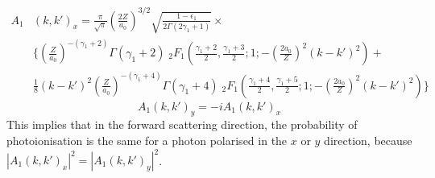 \begin{equation} \label{eq:A1-Forward}
\boxed{
\begin{split}
     A_1 & (k,k')_x  =  \frac{\pi}{\sqrt{\pi}}  
                        \left( \frac{2Z}{a_0} \right)^{3/2}
                        \sqrt{ \frac{1 - \epsilon_1}{
                                    2 \Gamma(2\gamma_1 + 1)
                               } } \times \\
    & \Biggl\{
        \left( \frac{Z}{a_0} \right)^{-(\gamma_1 + 2)}
    \Gamma(\gamma_1 + 2)
    \; _2 F_1 \left(
                \frac{\gamma_1 + 2}{2} ,
                \frac{\gamma_1 + 3}{2} ;
                1 ;
                - \left(
                    \frac{2a_0}{Z}
                \right)^2
                (k - k')^2
           \right)
    + \\ & 
    \frac{1}{8} (k - k')^2 
    \left( \frac{Z}{a_0} \right)^{-(\gamma_1 + 4)}
    \Gamma(\gamma_1 + 4)
    \; _2 F_1 \left(
                \frac{\gamma_1 + 4}{2} ,
                \frac{\gamma_1 + 5}{2} ; 
                1 ;
                - \left( \frac{2a_0}{Z} \right)^2
                (k - k')^2
            \right)
    \Biggr\}
\end{split}
}
\end{equation}
\begin{equation}
\boxed{
    A_1(k,k')_y = -i A_1(k,k')_x
}
\end{equation}
This implies that in the forward scattering direction, the probability of
photoionisation is the same for a photon polarised in the $x$ or $y$ direction,
because \( |A_1(k,k')_x|^2 = |A_1(k,k')_y|^2 \).

